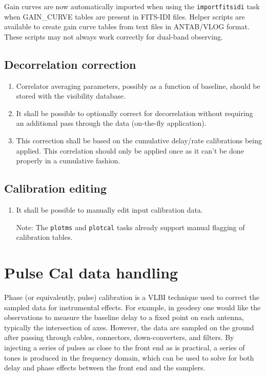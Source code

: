 \documentclass[11pt,a4paper]{article}
\begin{document}
Gain curves are now automatically imported when using the
\texttt{importfitsidi} task when GAIN{\_}CURVE tables are present in
FITS-IDI files.  Helper scripts are available to create gain curve
tables from text files in ANTAB/VLOG format.  These scripts may not
always work correctly for dual-band observing.


\subsection{Decorrelation correction}

\begin{enumerate}[subseclist]

\item Correlator averaging parameters, possibly as a function of
  baseline, should be stored with the visibility database.

\item It shall be possible to optionally correct for decorrelation
  without requiring an additional pass through the data (on-the-fly
  application).

\item This correction shall be based on the cumulative delay/rate
  calibrations being applied.  This correlation should only be applied
  once as it can't be done properly in a cumulative fashion.

\end{enumerate}


\subsection{Calibration editing}

\begin{enumerate}[subseclist]

\item It shall be possible to manually edit input calibration data.

  Note: The \texttt{plotms} and \texttt{plotcal} tasks already support
  manual flagging of calibration tables.

\end{enumerate}


\section{Pulse Cal data handling}

Phase (or equivalently, pulse) calibration is a VLBI technique used to
correct the sampled data for instrumental effects. For example, in
geodesy one would like the observations to measure the baseline delay
to a fixed point on each antenna, typically the intersection of
axes. However, the data are sampled on the ground after passing
through cables, connectors, down-converters, and filters.  By injecting
a series of pulses as close to the front end as is practical, a series
of tones is produced in the frequency domain, which can be used to
solve for both delay and phase effects between the front end and the
samplers.
\end{document}
